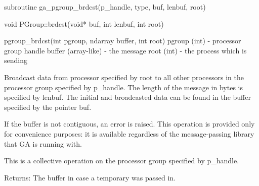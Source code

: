 \documentclass[12pt]{article}
\begin{document}
\begin{fapi}
\begin{fcode}
subroutine ga_pgroup_brdcst(p_handle, type, buf, lenbuf, root)
\end{fcode}
\begin{funcargs}
\end{funcargs}
\end{fapi}

\begin{cxxapi}
\begin{cxxcode}
void PGroup::brdcst(void* buf, int lenbuf, int root)
\end{cxxcode}
\begin{funcargs}
\end{funcargs}
\end{cxxapi}

\begin{pyapi}
\begin{pycode}
pgroup_brdcst(int pgroup, ndarray buffer, int root) 
   pgroup (int)        - processor group handle 
   buffer (array-like) - the message 
   root (int)          - the process which is sending 
\end{pycode}
\end{pyapi}
\gcoll
\begin{desc}

Broadcast data from processor specified by root to all other processors in the processor group specified by p_handle. The length of the message in bytes is specified by lenbuf. The initial and broadcasted data can be found in the buffer specified by the pointer buf.

If the buffer is not contiguous, an error is raised. This operation is provided only for convenience purposes: it is available regardless of the message-passing library that GA is running with.


This is a collective operation on the processor group specified by p_handle. 

Returns: 
The buffer in case a temporary was passed in. 
\end{desc}
\end{document}
